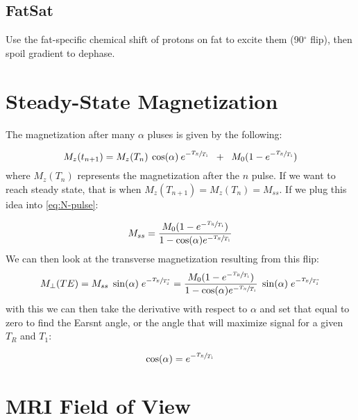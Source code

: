 \subsection{FatSat}
Use the fat-specific chemical shift of protons on fat to excite them (90$^\circ$ flip), then spoil gradient to dephase.
\section{Steady-State Magnetization}

The magnetization after many $\alpha$ pluses is given by the following:

\begin{equation}
M_z(t_{n+1}) = M_z(T_n) \: \cos(\alpha)\: e^{-\sfrac{T_R}{T_1}} \; \; + \; \; M_0 (1-e^{-\sfrac{T_R}{T_1}})
\label{eq:N-pulse}
\end{equation}
where $M_z(T_n)$ represents the magnetization after the $n$ pulse. If we want to reach steady state, that is when $M_z(T_{n+1})=M_z(T_n)=M_{ss}$. If we plug this idea into \ref{eq:N-pulse}:

\begin{equation}
M_{ss} = \frac{M_0 (1-e^{-\sfrac{T_R}{T_1}})}{1-\cos(\alpha)e^{-\sfrac{T_R}{T_1}}}
\end{equation}
We can then look at the transverse magnetization resulting from this flip:
\begin{equation}
M_{\perp}(TE) = M_{ss} \; \sin(\alpha)\;e^{-\sfrac{T_E}{T_2^*}}= \frac{M_0 (1-e^{-\sfrac{T_R}{T_1}})}{1-\cos(\alpha)e^{-\sfrac{T_R}{T_1}}} \; \sin(\alpha)\; e^{-\sfrac{T_E}{T_2^*}}
\end{equation}
with this we can then take the derivative with respect to $\alpha$ and set that equal to zero to find the Earsnt angle, or the angle that will maximize signal for a given $T_R$ and $T_1$:

\begin{equation}
\cos(\alpha) = e^{-\sfrac{T_R}{T_1}}
\end{equation}

\section{MRI Field of View}

